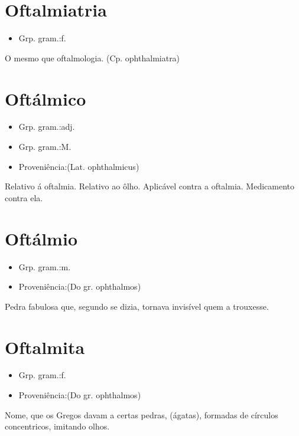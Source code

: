 \section{Oftalmiatria}
\begin{itemize}
\item {Grp. gram.:f.}
\end{itemize}
O mesmo que \textunderscore oftalmologia\textunderscore .
(Cp. \textunderscore ophthalmiatra\textunderscore )
\section{Oftálmico}
\begin{itemize}
\item {Grp. gram.:adj.}
\end{itemize}
\begin{itemize}
\item {Grp. gram.:M.}
\end{itemize}
\begin{itemize}
\item {Proveniência:(Lat. \textunderscore ophthalmicus\textunderscore )}
\end{itemize}
Relativo á oftalmia.
Relativo ao ôlho.
Aplicável contra a oftalmia.
Medicamento contra ela.
\section{Oftálmio}
\begin{itemize}
\item {Grp. gram.:m.}
\end{itemize}
\begin{itemize}
\item {Proveniência:(Do gr. \textunderscore ophthalmos\textunderscore )}
\end{itemize}
Pedra fabulosa que, segundo se dizia, tornava invisível quem a trouxesse.
\section{Oftalmita}
\begin{itemize}
\item {Grp. gram.:f.}
\end{itemize}
\begin{itemize}
\item {Proveniência:(Do gr. \textunderscore ophthalmos\textunderscore )}
\end{itemize}
Nome, que os Gregos davam a certas pedras, (ágatas), formadas de círculos concentricos, imitando olhos.
